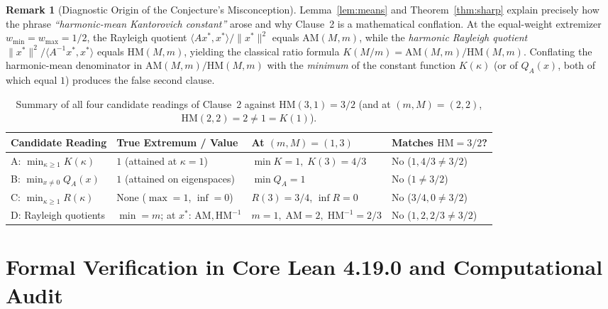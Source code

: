 \documentclass[11pt,a4paper]{article}
\theoremstyle{definition}
\newtheorem{remark}[theorem]{Remark}
\newcommand{\AM}{\mathrm{AM}}
\newcommand{\HM}{\mathrm{HM}}
\begin{document}
\begin{remark}[Diagnostic Origin of the Conjecture's Misconception]
\label{rem:origin}
Lemma~\ref{lem:means} and Theorem~\ref{thm:sharp} explain precisely how the
phrase \emph{``harmonic-mean Kantorovich constant''} arose and why Clause~2 is a
mathematical conflation. At the equal-weight extremizer $w_{\min} = w_{\max} = 1/2$,
the Rayleigh quotient $\langle Ax^*, x^*\rangle / \|x^*\|^2$ equals $\AM(M,m)$,
while the \emph{harmonic Rayleigh quotient}
$\|x^*\|^2 / \langle A^{-1}x^*, x^*\rangle$ equals $\HM(M,m)$, yielding the
classical ratio formula $K(M/m) = \AM(M,m)/\HM(M,m)$. Conflating the
harmonic-mean denominator in $\AM(M,m)/\HM(M,m)$ with the \emph{minimum} of the
constant function $K(\kappa)$ (or of $Q_A(x)$, both of which equal $1$) produces
the false second clause.
\end{remark}

\begin{table}[ht]
\centering
\footnotesize
\setlength{\tabcolsep}{3.5pt}
\begin{tabular}{llll}
\hline
\textbf{Candidate Reading} & \textbf{True Extremum / Value} & \textbf{At $(m,M)=(1,3)$} & \textbf{Matches $\HM=3/2$?} \\
\hline
A: $\min_{\kappa \ge 1} K(\kappa)$ & $1$ (attained at $\kappa = 1$) & $\min K = 1,\; K(3)=4/3$ & No ($1, 4/3 \ne 3/2$) \\
B: $\min_{x \ne 0} Q_A(x)$ & $1$ (attained on eigenspaces) & $\min Q_A = 1$ & No ($1 \ne 3/2$) \\
C: $\min_{\kappa \ge 1} R(\kappa)$ & None ($\max = 1$, $\inf = 0$) & $R(3)=3/4$, $\inf R = 0$ & No ($3/4, 0 \ne 3/2$) \\
D: Rayleigh quotients & $\min = m$; at $x^*$: $\AM, \HM^{-1}$ & $m=1,\; \AM=2,\; \HM^{-1}=2/3$ & No ($1, 2, 2/3 \ne 3/2$) \\
\hline
\end{tabular}
\caption{Summary of all four candidate readings of Clause~2 against $\HM(3,1) = 3/2$
(and at $(m,M) = (2,2)$, $\HM(2,2) = 2 \ne 1 = K(1)$).}
\label{tab:summary}
\end{table}

\section{Formal Verification in Core Lean 4.19.0 and Computational Audit}
\label{sec:lean}
\end{document}
